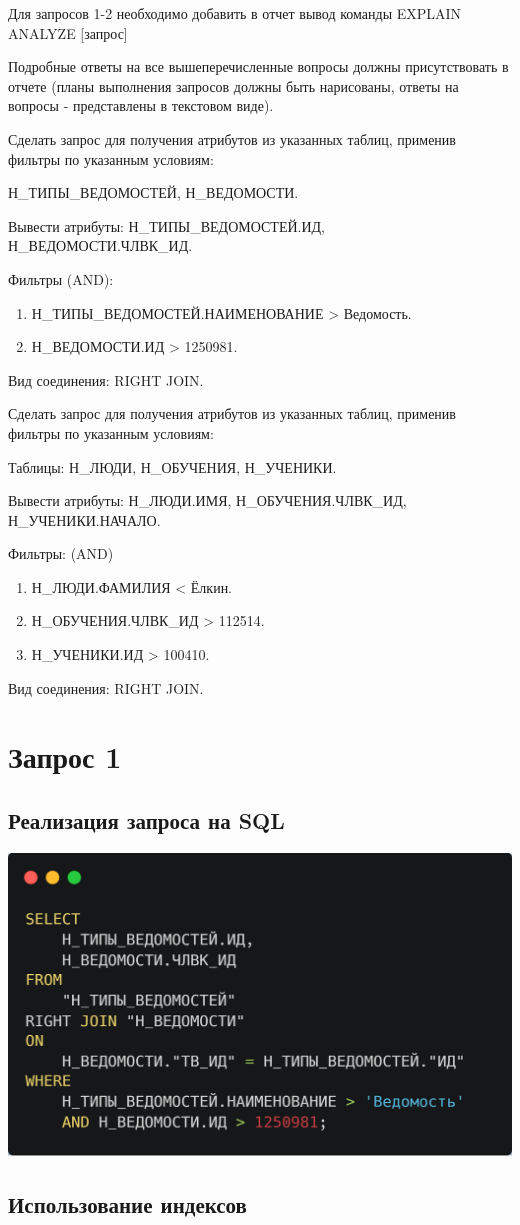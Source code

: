 \documentclass[12pt]{article}
\begin{document}
	Для запросов 1-2 необходимо добавить в отчет вывод команды EXPLAIN ANALYZE [запрос]
	
	Подробные ответы на все вышеперечисленные вопросы должны присутствовать в отчете (планы выполнения запросов должны быть нарисованы, ответы на вопросы - представлены в текстовом виде).
	
	Сделать запрос для получения атрибутов из указанных таблиц, применив фильтры по указанным условиям:
	
	Н_ТИПЫ_ВЕДОМОСТЕЙ, Н_ВЕДОМОСТИ.
	
	Вывести атрибуты: Н_ТИПЫ_ВЕДОМОСТЕЙ.ИД, Н_ВЕДОМОСТИ.ЧЛВК_ИД.
	
	Фильтры (AND):
	\begin{enumerate}[]
	\item Н_ТИПЫ_ВЕДОМОСТЕЙ.НАИМЕНОВАНИЕ > Ведомость.
	\item Н_ВЕДОМОСТИ.ИД > 1250981.
	\end{enumerate}
	Вид соединения: RIGHT JOIN.
	
	Сделать запрос для получения атрибутов из указанных таблиц, применив фильтры по указанным условиям:
	
	Таблицы: Н_ЛЮДИ, Н_ОБУЧЕНИЯ, Н_УЧЕНИКИ.
	
	Вывести атрибуты: Н_ЛЮДИ.ИМЯ, Н_ОБУЧЕНИЯ.ЧЛВК_ИД, Н_УЧЕНИКИ.НАЧАЛО.
	
	Фильтры: (AND)
	\begin{enumerate}[]
	\item Н_ЛЮДИ.ФАМИЛИЯ < Ёлкин.
	\item Н_ОБУЧЕНИЯ.ЧЛВК_ИД > 112514.
	\item Н_УЧЕНИКИ.ИД > 100410.
	\end{enumerate}
	Вид соединения: RIGHT JOIN.
	\newpage
	
	\section{Запрос 1}
	\subsection{Реализация запроса на SQL}
	\includegraphics[width=0.3\linewidth]{sql1}
	\subsection{Использование индексов}
\end{document}
